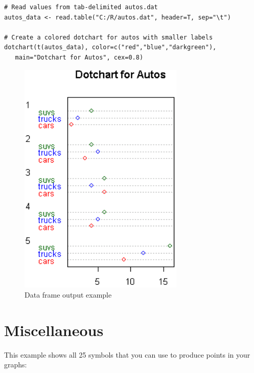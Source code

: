\documentclass[10pt]{book}
\begin{document}
\begin{lstlisting}
# Read values from tab-delimited autos.dat
autos_data <- read.table("C:/R/autos.dat", header=T, sep="\t")

# Create a colored dotchart for autos with smaller labels
dotchart(t(autos_data), color=c("red","blue","darkgreen"),
   main="Dotchart for Autos", cex=0.8)
\end{lstlisting}
\begin{figure}[H]
    \begin{flushleft}
        \includegraphics[width=0.7\textwidth]{dot_script2.png}
        \caption{Data frame output example}
        \label{fig:dataframe}
    \end{flushleft}
\end{figure}


\section*{Miscellaneous}

This example shows all 25 symbols that you can use to produce points in your graphs:
\end{document}
